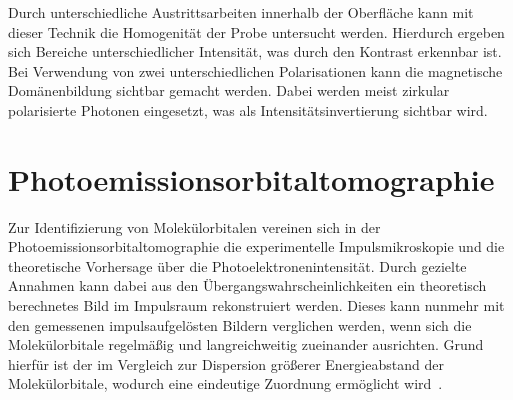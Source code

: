             Durch unterschiedliche Austrittsarbeiten innerhalb der Oberfläche kann mit dieser Technik die Homogenität der Probe untersucht werden.
            Hierdurch ergeben sich Bereiche unterschiedlicher Intensität, was durch den Kontrast erkennbar ist.
            Bei Verwendung von zwei unterschiedlichen Polarisationen kann die magnetische Domänenbildung sichtbar gemacht werden.
            Dabei werden meist zirkular polarisierte Photonen eingesetzt, was als Intensitätsinvertierung sichtbar wird.
        
    \section{Photoemissionsorbitaltomographie} \label{sec:MOT}
        Zur Identifizierung von Molekülorbitalen vereinen sich in der Photoemissionsorbitaltomographie die experimentelle Impulsmikroskopie und die theoretische Vorhersage über die Photoelektronenintensität.
        Durch gezielte Annahmen kann dabei aus den Übergangswahrscheinlichkeiten ein theoretisch berechnetes Bild im Impulsraum rekonstruiert werden.
        Dieses kann nunmehr mit den gemessenen impulsaufgelösten Bildern verglichen werden, wenn sich die Molekülorbitale regelmäßig und langreichweitig zueinander ausrichten.
        Grund hierfür ist der im Vergleich zur Dispersion größerer Energieabstand der Molekülorbitale, wodurch eine eindeutige Zuordnung ermöglicht wird~\cite{puschnig_reconstruction_2009}.

